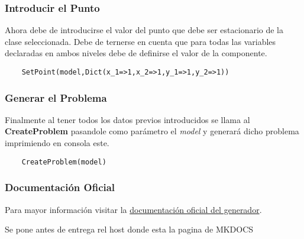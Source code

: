 \subsubsection{Introducir el Punto}
Ahora debe de introducirse el valor del punto que debe ser estacionario de la clase seleccionada.
Debe de ternerse en cuenta que para todas las variables declaradas en ambos niveles debe de definirse el valor de la componente.

\begin{lstlisting}
    SetPoint(model,Dict(x_1=>1,x_2=>1,y_1=>1,y_2=>1))
\end{lstlisting}

\subsubsection{Generar el Problema}
Finalmente al tener todos los datos previos introducidos se llama al \textbf{CreateProblem} pasandole como parámetro el \textit{model} 
y generará dicho problema imprimiendo en consola este.

\begin{lstlisting}
    CreateProblem(model)
\end{lstlisting}


\subsubsection{Documentación Oficial}
Para mayor información visitar la \href{https://github.com/FVSB/Tesis}{documentación oficial del generador}. 

Se pone antes de entrega rel host donde esta la pagina de MKDOCS
